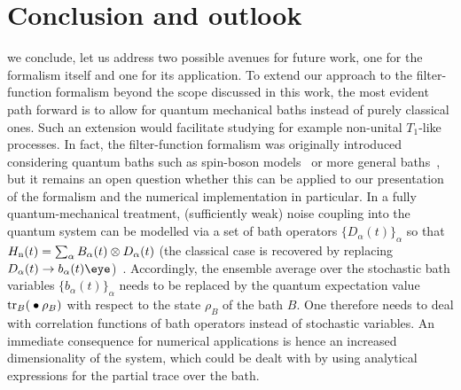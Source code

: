 \chapter{Conclusion and outlook}\label{ch:ff:conclusion}
 we conclude, let us address two possible avenues for future work, one for the formalism itself and one for its application.
To extend our approach to the filter-function formalism beyond the scope discussed in this work, the most evident path forward is to allow for quantum mechanical baths instead of purely classical ones.
Such an extension would facilitate studying for example non-unital $T_1$-like processes.
In fact, the filter-function formalism was originally introduced considering quantum baths such as spin-boson models~\cite{Martinis2003,Uhrig2007} or more general baths~\cite{Kofman2001,Yuge2011,Paz-Silva2017}, but it remains an open question whether this can be applied to our presentation of the formalism and the numerical implementation in particular.
In a fully quantum-mechanical treatment, (sufficiently weak) noise coupling into the quantum system can be modelled via a set of bath operators $\{D_\alpha(t)\}_\alpha$ so that $H_{\mathrm{n}}(t) = \sum_\alpha B_\alpha(t)\otimes D_\alpha(t)$ (the classical case is recovered by replacing $D_\alpha(t)\rightarrow b_\alpha(t)\eye$)~\cite{Breuer2007}.
Accordingly, the ensemble average over the stochastic bath variables $\{b_\alpha(t)\}_\alpha$ needs to be replaced by the quantum expectation value $\tr_B(\:\bullet\:\rho_B)$ with respect to the state $\rho_B$ of the bath $B$.
One therefore needs to deal with correlation functions of bath operators instead of stochastic variables.
An immediate consequence for numerical applications is hence an increased dimensionality of the system, which could be dealt with by using analytical expressions for the partial trace over the bath.

